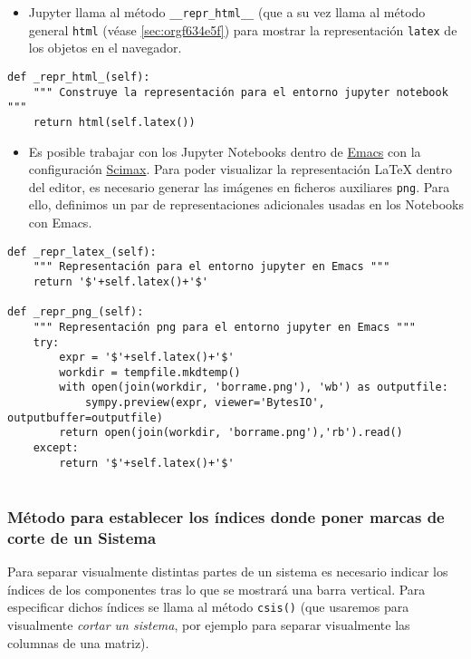 \documentclass[11pt]{report}
\begin{document}
\begin{itemize}
\item Jupyter llama al método \texttt{\_\_repr\_html\_\_} (que a su vez llama al
método general \texttt{html} (véase \ref{sec:orgf634e5f}) para mostrar la representación \texttt{latex} de los
objetos en el navegador.
\end{itemize}


\begin{verbatim}
def _repr_html_(self):
    """ Construye la representación para el entorno jupyter notebook """
    return html(self.latex())

\end{verbatim}

\begin{itemize}
\item Es posible trabajar con los Jupyter Notebooks dentro de \href{https://www.gnu.org/software/emacs/}{Emacs} con la
configuración \href{https://github.com/jkitchin/scimax}{Scimax}. Para poder visualizar la representación
\LaTeX{} dentro del editor, es necesario generar las imágenes en
ficheros auxiliares \texttt{png}. Para ello, definimos un par de
representaciones adicionales usadas en los Notebooks con Emacs.
\end{itemize}


\begin{verbatim}
def _repr_latex_(self):
    """ Representación para el entorno jupyter en Emacs """
    return '$'+self.latex()+'$'

def _repr_png_(self):
    """ Representación png para el entorno jupyter en Emacs """
    try:
        expr = '$'+self.latex()+'$'
        workdir = tempfile.mkdtemp()
        with open(join(workdir, 'borrame.png'), 'wb') as outputfile:
            sympy.preview(expr, viewer='BytesIO', outputbuffer=outputfile)
        return open(join(workdir, 'borrame.png'),'rb').read()
    except:
        return '$'+self.latex()+'$'
                                                               
\end{verbatim}

\subsubsection{Método para establecer los índices donde poner marcas de corte de un Sistema}
\label{sec:org204f3e9}

Para separar visualmente distintas partes de un sistema es necesario
indicar los índices de los componentes tras lo que se mostrará una
barra vertical. Para especificar dichos índices se llama al método
\texttt{csis()} (que usaremos para visualmente \emph{cortar un sistema}, por
ejemplo para separar visualmente las columnas de una matriz).
\end{document}
